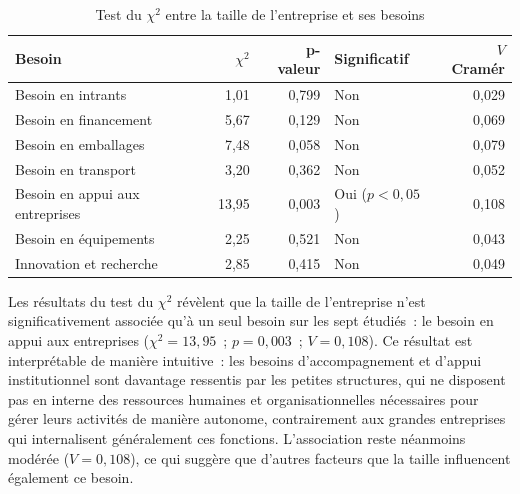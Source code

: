 \documentclass[12pt, a4paper, oneside]{report}
\begin{document}
			\begin{table}[H]
				\centering
				\caption{Test du $\chi^2$ entre la taille de l'entreprise et ses besoins}
				\label{tab:khi2_taille}
				\renewcommand{\arraystretch}{1.4}
				\begin{tabularx}{\textwidth}{>{\raggedright\arraybackslash}X
						r r
						>{\centering\arraybackslash}p{3cm}
						r}
					\toprule
					\rowcolor{primary!15}
					\textbf{Besoin} & \textbf{$\chi^2$} & \textbf{p-valeur}
					& \textbf{Significatif} & \textbf{$V$ Cramér} \\
					\midrule
					
					Besoin en intrants
					& 1,01 & 0,799 & Non & 0,029 \\
					
					\rowcolor{lightgray}
					Besoin en financement
					& 5,67 & 0,129 & Non & 0,069 \\
					
					Besoin en emballages
					& 7,48 & 0,058 & Non & 0,079 \\
					
					\rowcolor{lightgray}
					Besoin en transport
					& 3,20 & 0,362 & Non & 0,052 \\
					
					Besoin en appui aux entreprises
					& 13,95 & 0,003 & Oui ($p < 0{,}05$) & 0,108 \\
					
					\rowcolor{lightgray}
					Besoin en équipements
					& 2,25 & 0,521 & Non & 0,043 \\
					
					Innovation et recherche
					& 2,85 & 0,415 & Non & 0,049 \\
					
					\bottomrule
				\end{tabularx}
			\end{table}
			
			Les résultats du test du $\chi^2$ révèlent que la taille de
			l'entreprise n'est significativement associée qu'à un seul besoin sur
			les sept étudiés~: le besoin en appui aux entreprises ($\chi^2 =
			13{,}95$~; $p = 0{,}003$~; $V = 0{,}108$). Ce résultat est
			interprétable de manière intuitive~: les besoins d'accompagnement et
			d'appui institutionnel sont davantage ressentis par les petites
			structures, qui ne disposent pas en interne des ressources humaines
			et organisationnelles nécessaires pour gérer leurs activités de
			manière autonome, contrairement aux grandes entreprises qui
			internalisent généralement ces fonctions. L'association reste
			néanmoins modérée ($V = 0{,}108$), ce qui suggère que d'autres
			facteurs que la taille influencent également ce besoin.
			
\end{document}
